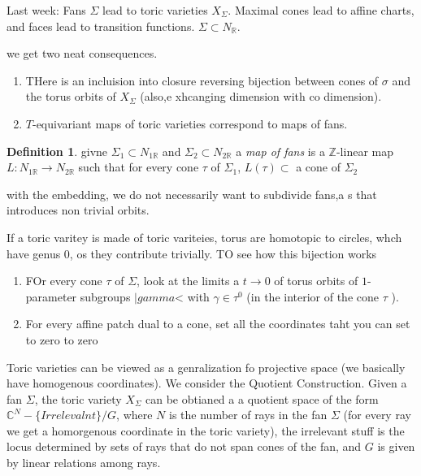 \documentclass[11pt]{article}
\theoremstyle{definition}
\newtheorem{protodefinition}{Definition}[section]
\newenvironment{define}
   {\begin{protodefinition}}
   {\end{protodefinition}}
\def\ZZ{{\mathbb Z}}
\def\RR{{\mathbb R}}
\def\CC{{\mathbb C}}
\begin{document}


Last week: Fans $\Sigma$ lead to toric varieties $X_\Sigma$. Maximal cones lead to affine charts, and faces lead to transition functions. $\Sigma \subset N_\RR$. 


we get two neat consequences.
\begin{enumerate}
    \item THere is an incluision into closure reversing bijection between cones of $\sigma$ and the torus orbits of $X_\Sigma$ (also,e xhcanging dimension with co dimension).
    \item $T$-equivariant maps of toric varieties correspond to maps of fans.
\end{enumerate}

\begin{define}
    givne $\Sigma_1 \subset N_{1\RR}$ and $\Sigma_2 \subset N_{2\RR}$ a \emph{map of fans} is a $\ZZ$-linear map $L: N_{1\RR}\rightarrow N_{2\RR}$ such that for every cone $\tau$ of $\Sigma_1$, $L(\tau) \subset $ a cone of $\Sigma_2$
\end{define}
with the embedding, we do not necessarily want to subdivide fans,a s that introduces non trivial orbits.

If a toric varitey is made of toric variteies, torus are homotopic to circles, whch have genus 0, os they contribute trivially.
TO see how this bijection works

\begin{enumerate}
    \item FOr every cone $\tau$ of $\Sigma$, look at the limits a $t \rightarrow 0$ of  torus orbits of $1$-parameter subgroups $|gamma$< with $\gamma \in \tau^0$ (in the interior of the cone $\tau$ ).
    \item For every affine patch dual to a cone, set all the coordinates taht you can set to zero to zero
\end{enumerate}



Toric varieties can be viewed as a genralization fo projective space (we basically have homogenous coordinates). We consider the Quotient Construction. Given a fan $\Sigma$, the toric variety $X_\Sigma$ can be obtianed a a quotient space of the form $\CC^{N}- \{Irrelevalnt\} / G$, where $N$ is the number of rays in the fan $\Sigma$ (for every ray we get a homorgenous coordinate in the toric variety), the irrelevant stuff is the locus determined by sets of rays that do not span cones of the fan, and $G$ is given by linear relations among rays.
\end{document}
